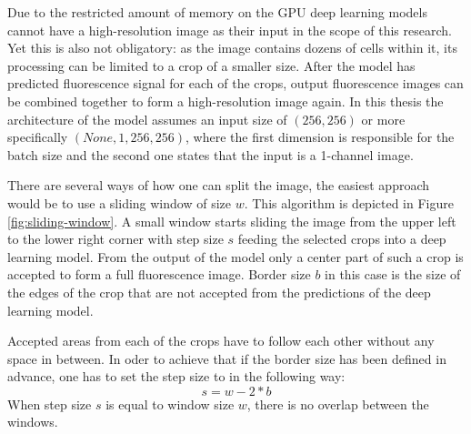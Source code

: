 Due to the restricted amount of memory on the GPU deep learning models cannot have a high-resolution image as their input in the scope of this research. Yet this is also not obligatory: as the image contains dozens of cells within it, its processing can be limited to a crop of a smaller size. After the model has predicted fluorescence signal for each of the crops, output fluorescence images can be combined together to form a high-resolution image again. In this thesis the architecture of the model assumes an input size of $(256, 256)$ or more specifically $(None, 1, 256, 256)$, where the first dimension is responsible for the batch size and the second one states that the input is a 1-channel image. 

There are several ways of how one can split the image, the easiest approach would be to use a sliding window of size $w$. This algorithm is depicted in Figure \ref{fig:sliding-window}. A small window starts sliding the image from the upper left to the lower right corner with step size $s$ feeding the selected crops into a deep learning model. From the output of the model only a center part of such a crop is accepted to form a full fluorescence image. Border size $b$ in this case is the size of the edges of the crop that are not accepted from the predictions of the deep learning model.

Accepted areas from each of the crops have to follow each other without any space in between. In oder to achieve that if the border size has been defined in advance, one has to set the step size to in the following way:
\begin{equation}
  s = w - 2 * b
\end{equation}
When step size $s$ is equal to window size $w$, there is no overlap between the windows.

